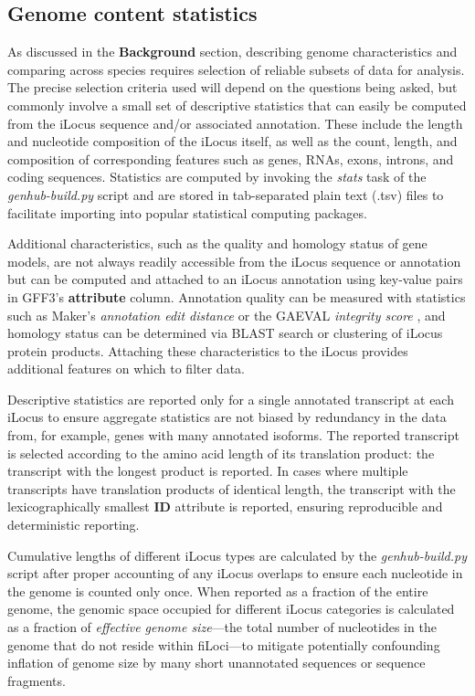 \subsection{Genome content statistics}
As discussed in the \textbf{Background} section, describing genome characteristics and comparing across species requires selection of reliable subsets of data for analysis.
The precise selection criteria used will depend on the questions being asked, but commonly involve a small set of descriptive statistics that can easily be computed from the iLocus sequence and/or associated annotation.
These include the length and nucleotide composition of the iLocus itself, as well as the count, length, and composition of corresponding features such as genes, RNAs, exons, introns, and coding sequences.
Statistics are computed by invoking the \textit{stats} task of the \textit{genhub-build.py} script and are stored in tab-separated plain text (.tsv) files to facilitate importing into popular statistical computing packages.

Additional characteristics, such as the quality and homology status of gene models, are not always readily accessible from the iLocus sequence or annotation but can be computed and attached to an iLocus annotation using key-value pairs in GFF3's \textbf{attribute} column.
Annotation quality can be measured with statistics such as Maker's \textit{annotation edit distance} \cite{AED} or the GAEVAL \textit{integrity score} \cite{GAEVAL}, and  homology status can be determined via BLAST search or clustering of iLocus protein products.
Attaching these characteristics to the iLocus provides additional features on which to filter data.

Descriptive statistics are reported only for a single annotated transcript at each iLocus to ensure aggregate statistics are not biased by redundancy in the data from, for example, genes with many annotated isoforms.
The reported transcript is selected according to the amino acid length of its translation product: the transcript with the longest product is reported.
In cases where multiple transcripts have translation products of identical length, the transcript with the lexicographically smallest \textbf{ID} attribute is reported, ensuring reproducible and deterministic reporting.

Cumulative lengths of different iLocus types are calculated by the \textit{genhub-build.py} script after proper accounting of any iLocus overlaps to ensure each nucleotide in the genome is counted only once.
When reported as a fraction of the entire genome, the genomic space occupied for different iLocus categories is calculated as a fraction of \textit{effective genome size}---the total number of nucleotides in the genome that do not reside within fiLoci---to mitigate potentially confounding inflation of genome size by many short unannotated sequences or sequence fragments.

